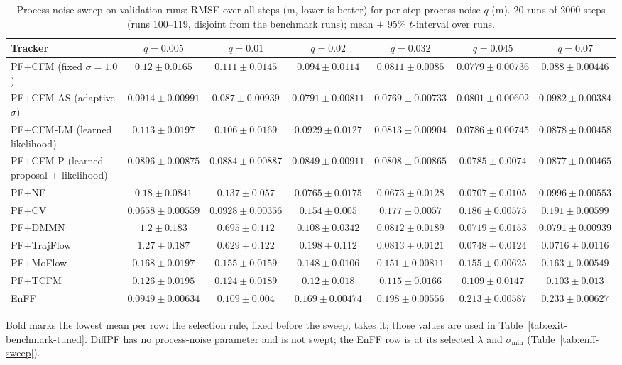 \begin{table}[ht]
\centering
\small
\caption{Process-noise sweep on validation runs: RMSE over all steps (m, lower is better) for per-step process noise $q$ (m). 20 runs of 2000 steps (runs 100--119, disjoint from the benchmark runs); mean $\pm$ 95\% $t$-interval over runs.}
\label{tab:noise-sweep-rmse}
\begin{adjustbox}{max width=\linewidth}
\begin{tabular}{lcccccc}
\toprule
Tracker & $q{=}0.005$ & $q{=}0.01$ & $q{=}0.02$ & $q{=}0.032$ & $q{=}0.045$ & $q{=}0.07$ \\
\midrule
PF+CFM (fixed $\sigma{=}1.0$) & $0.12\pm0.0165$ & $0.111\pm0.0145$ & $0.094\pm0.0114$ & $0.0811\pm0.0085$ & $\mathbf{0.0779\pm0.00736}$ & $0.088\pm0.00446$ \\
PF+CFM-AS (adaptive $\sigma$) & $0.0914\pm0.00991$ & $0.087\pm0.00939$ & $0.0791\pm0.00811$ & $\mathbf{0.0769\pm0.00733}$ & $0.0801\pm0.00602$ & $0.0982\pm0.00384$ \\
PF+CFM-LM (learned likelihood) & $0.113\pm0.0197$ & $0.106\pm0.0169$ & $0.0929\pm0.0127$ & $0.0813\pm0.00904$ & $\mathbf{0.0786\pm0.00745}$ & $0.0878\pm0.00458$ \\
PF+CFM-P (learned proposal + likelihood) & $0.0896\pm0.00875$ & $0.0884\pm0.00887$ & $0.0849\pm0.00911$ & $0.0808\pm0.00865$ & $\mathbf{0.0785\pm0.0074}$ & $0.0877\pm0.00465$ \\
PF+NF & $0.18\pm0.0841$ & $0.137\pm0.057$ & $0.0765\pm0.0175$ & $\mathbf{0.0673\pm0.0128}$ & $0.0707\pm0.0105$ & $0.0996\pm0.00553$ \\
PF+CV & $\mathbf{0.0658\pm0.00559}$ & $0.0928\pm0.00356$ & $0.154\pm0.005$ & $0.177\pm0.0057$ & $0.186\pm0.00575$ & $0.191\pm0.00599$ \\
PF+DMMN & $1.2\pm0.183$ & $0.695\pm0.112$ & $0.108\pm0.0342$ & $0.0812\pm0.0189$ & $\mathbf{0.0719\pm0.0153}$ & $0.0791\pm0.00939$ \\
\midrule
PF+TrajFlow & $1.27\pm0.187$ & $0.629\pm0.122$ & $0.198\pm0.112$ & $0.0813\pm0.0121$ & $0.0748\pm0.0124$ & $\mathbf{0.0716\pm0.0116}$ \\
PF+MoFlow & $0.168\pm0.0197$ & $0.155\pm0.0159$ & $\mathbf{0.148\pm0.0106}$ & $0.151\pm0.00811$ & $0.155\pm0.00625$ & $0.163\pm0.00549$ \\
PF+TCFM & $0.126\pm0.0195$ & $0.124\pm0.0189$ & $0.12\pm0.018$ & $0.115\pm0.0166$ & $0.109\pm0.0147$ & $\mathbf{0.103\pm0.013}$ \\
EnFF & $\mathbf{0.0949\pm0.00634}$ & $0.109\pm0.004$ & $0.169\pm0.00474$ & $0.198\pm0.00556$ & $0.213\pm0.00587$ & $0.233\pm0.00627$ \\
\bottomrule
\end{tabular}
\end{adjustbox}
\par\smallskip\parbox{0.95\linewidth}{\footnotesize Bold marks the lowest mean per row: the selection rule, fixed before the sweep, takes it; those values are used in Table~\ref{tab:exit-benchmark-tuned}. DiffPF has no process-noise parameter and is not swept; the EnFF row is at its selected $\lambda$ and $\sigma_{\min}$ (Table~\ref{tab:enff-sweep}).}
\end{table}

